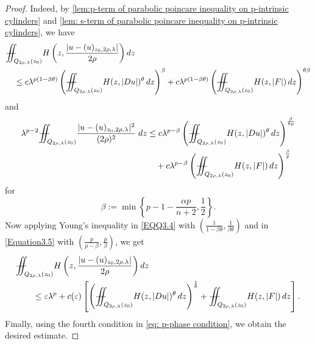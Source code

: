 \documentclass[11pt,oneside, english,reqno,twoside a4paper]{amsart}
\theoremstyle{definition}
\numberwithin{theorem}{section}
\numberwithin{equation}{section}
\newcommand{\la}{\lambda}
\newcommand{\iintss}{{\int\hspace{-0.28cm}\int}}
\newcommand{ \miints }{{\iintss\hspace{-0.56cm} -\hspace{-0.15cm}-}}
\newcommand{\miint}[1]{{\miints_{\hspace{-0.13cm}#1}}}
\begin{document}
\begin{proof}
Indeed, by \cref{lem:p-term of parabolic poincare inequality on p-intrinsic cylinders} and \cref{lem: s-term of parabolic poincare inequality on p-intrinsic cylinders}, we have
\begin{align}\label{EQQ3.4}
&\miint{Q_{2\rho,\lambda}(z_0)} H\left(z,\frac{|u-(u)_{z_0, 2\rho, \lambda}|}{2\rho}\right) dz\nonumber\\
&\quad \leq c\lambda^{p(1-\beta \theta)}\left(\miint{Q_{2\rho, \lambda}(z_0)}H(z, |Du|)^{\theta}\, dz\right)^{\beta}+c\lambda^{p(1-\beta \theta)}\left(\miint{Q_{2\rho, \lambda}(z_0)}H(z, |F|)\,dz\right)^{\theta \beta}
\end{align}
and 
\begin{align}\label{Equation3.5}
\la^{p-2}\miint{Q_{2\rho, \lambda}(z_0)}\frac{|u-(u)_{z_0, 2\rho, \lambda}|^2}{(2\rho)^2}\;dz&\leq c\lambda^{p-\beta}\left(\miint{Q_{2\rho, \lambda}(z_0)}H(z, |Du|)^{\theta}\, dz\right)^{\frac{\beta}{\theta p}}\nonumber\\
&\quad +c\lambda^{p-\beta}\left(\miint{Q_{2\rho, \lambda}(z_0)}H(z, |F|)\, dz\right)^{\frac{\beta}{p}}    
\end{align}
for $$\beta:=\min\left\{p-1-\frac{\alpha p}{n+2}, \frac{1}{2}\right\}.$$ Now applying Young's inequality in \eqref{EQQ3.4} with $\left(\frac{1}{1-\beta \theta}, \frac{1}{\beta \theta}\right)$ and in \eqref{Equation3.5} with $\left(\frac{p}{p-\beta}, \frac{p}{\beta}\right)$, we get
\begin{align*}
&\miint{Q_{2\rho,\lambda}(z_0)} H\left(z,\frac{|u-(u)_{z_0, 2\rho, \lambda}|}{2\rho}\right) dz \\
&\qquad \leq \varepsilon \lambda^p+c(\varepsilon)\left[\left(\miint{Q_{2\rho, \lambda}(z_0)}H(z, |Du|)^{\theta}\, dz\right)^{\frac{1}{\theta}} + \miint{Q_{2\rho, \lambda}(z_0)}H(z, |F|)\, dz\right].    
\end{align*}
Finally, using the fourth condition in \eqref{eq: p-phase condition}, we obtain the desired estimate.
\end{proof}
\end{document}
